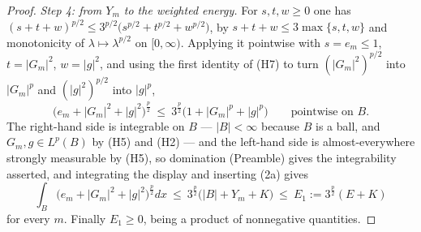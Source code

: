 \begin{proof}
\emph{Step 4: from $Y_m$ to the weighted energy.}  For $s,t,w\ge0$ one has
$(s+t+w)^{p/2}\le3^{p/2}\bigl(s^{p/2}+t^{p/2}+w^{p/2}\bigr)$, by
$s+t+w\le3\max\{s,t,w\}$ and monotonicity of $\lambda\mapsto\lambda^{p/2}$ on
$[0,\infty)$.  Applying it pointwise with $s=e_m\le1$, $t=|G_m|^2$,
$w=|g|^2$, and using the first identity of (H7) to turn $(|G_m|^2)^{p/2}$ into
$|G_m|^p$ and $(|g|^2)^{p/2}$ into $|g|^p$,
\[
\bigl(e_m+|G_m|^2+|g|^2\bigr)^{\frac p2}
\ \le\ 3^{\frac p2}\bigl(1+|G_m|^p+|g|^p\bigr)
\qquad\text{pointwise on }B .
\]
The right-hand side is integrable on $B$ --- $|B|<\infty$ because $B$ is a ball,
and $G_m,g\in L^p(B)$ by (H5) and (H2) --- and the left-hand side is
almost-everywhere strongly measurable by (H5), so domination (Preamble) gives
the integrability asserted, and integrating the display and inserting (2a)
gives
\[
\int_B\bigl(e_m+|G_m|^2+|g|^2\bigr)^{\frac p2}dx
\ \le\ 3^{\frac p2}\bigl(|B|+Y_m+K\bigr)
\ \le\ E_1:=3^{\frac p2}(E+K)
\]
for every $m$.  Finally $E_1\ge0$, being a product of nonnegative quantities.
\end{proof}
